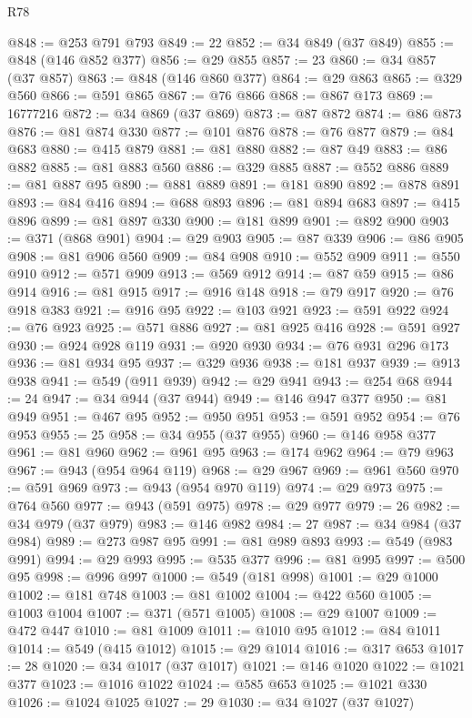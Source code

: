 \begin{lexlean}{R78}
\begin{coremodule}
@848 := @253 @791 @793
@849 := 22
@852 := @34 @849 (@37 @849)
@855 := @848 (@146 @852 @377)
@856 := @29 @855
@857 := 23
@860 := @34 @857 (@37 @857)
@863 := @848 (@146 @860 @377)
@864 := @29 @863
@865 := @329 @560
@866 := @591 @865
@867 := @76 @866
@868 := @867 @173
@869 := 16777216
@872 := @34 @869 (@37 @869)
@873 := @87 @872
@874 := @86 @873
@876 := @81 @874 @330
@877 := @101 @876
@878 := @76 @877
@879 := @84 @683
@880 := @415 @879
@881 := @81 @880
@882 := @87 @49
@883 := @86 @882
@885 := @81 @883 @560
@886 := @329 @885
@887 := @552 @886
@889 := @81 @887 @95
@890 := @881 @889
@891 := @181 @890
@892 := @878 @891
@893 := @84 @416
@894 := @688 @893
@896 := @81 @894 @683
@897 := @415 @896
@899 := @81 @897 @330
@900 := @181 @899
@901 := @892 @900
@903 := @371 (@868 @901)
@904 := @29 @903
@905 := @87 @339
@906 := @86 @905
@908 := @81 @906 @560
@909 := @84 @908
@910 := @552 @909
@911 := @550 @910
@912 := @571 @909
@913 := @569 @912
@914 := @87 @59
@915 := @86 @914
@916 := @81 @915
@917 := @916 @148
@918 := @79 @917
@920 := @76 @918 @383
@921 := @916 @95
@922 := @103 @921
@923 := @591 @922
@924 := @76 @923
@925 := @571 @886
@927 := @81 @925 @416
@928 := @591 @927
@930 := @924 @928 @119
@931 := @920 @930
@934 := @76 @931 @296 @173
@936 := @81 @934 @95
@937 := @329 @936
@938 := @181 @937
@939 := @913 @938
@941 := @549 (@911 @939)
@942 := @29 @941
@943 := @254 @68
@944 := 24
@947 := @34 @944 (@37 @944)
@949 := @146 @947 @377
@950 := @81 @949
@951 := @467 @95
@952 := @950 @951
@953 := @591 @952
@954 := @76 @953
@955 := 25
@958 := @34 @955 (@37 @955)
@960 := @146 @958 @377
@961 := @81 @960
@962 := @961 @95
@963 := @174 @962
@964 := @79 @963
@967 := @943 (@954 @964 @119)
@968 := @29 @967
@969 := @961 @560
@970 := @591 @969
@973 := @943 (@954 @970 @119)
@974 := @29 @973
@975 := @764 @560
@977 := @943 (@591 @975)
@978 := @29 @977
@979 := 26
@982 := @34 @979 (@37 @979)
@983 := @146 @982
@984 := 27
@987 := @34 @984 (@37 @984)
@989 := @273 @987 @95
@991 := @81 @989 @893
@993 := @549 (@983 @991)
@994 := @29 @993
@995 := @535 @377
@996 := @81 @995
@997 := @500 @95
@998 := @996 @997
@1000 := @549 (@181 @998)
@1001 := @29 @1000
@1002 := @181 @748
@1003 := @81 @1002
@1004 := @422 @560
@1005 := @1003 @1004
@1007 := @371 (@571 @1005)
@1008 := @29 @1007
@1009 := @472 @447
@1010 := @81 @1009
@1011 := @1010 @95
@1012 := @84 @1011
@1014 := @549 (@415 @1012)
@1015 := @29 @1014
@1016 := @317 @653
@1017 := 28
@1020 := @34 @1017 (@37 @1017)
@1021 := @146 @1020
@1022 := @1021 @377
@1023 := @1016 @1022
@1024 := @585 @653
@1025 := @1021 @330
@1026 := @1024 @1025
@1027 := 29
@1030 := @34 @1027 (@37 @1027)

\end{coremodule}
\end{lexlean}
